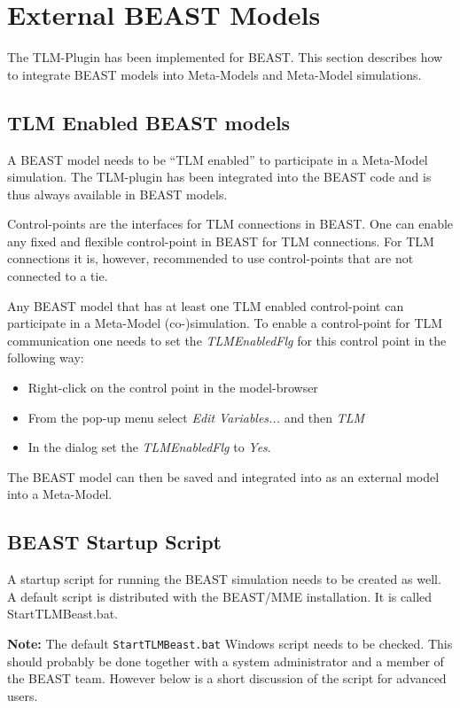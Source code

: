 \chapter{External BEAST Models}
\label{MMBEAST}
The TLM-Plugin has been implemented for BEAST. This section describes
how to integrate BEAST models into Meta-Models and Meta-Model
simulations.

\section{TLM Enabled BEAST models}
A BEAST model needs to be ``TLM enabled'' to participate in a
Meta-Model simulation. The TLM-plugin has been integrated into the
BEAST code and is thus always available in BEAST models.

Control-points are the interfaces for TLM connections in BEAST. One
can enable any fixed and flexible control-point in BEAST for TLM
connections. For TLM connections it is, however, recommended to use
control-points that are not connected to a tie.

Any BEAST model that has at least one TLM enabled control-point can
participate in a Meta-Model (co-)simulation. To enable a control-point
for TLM communication one needs to set the {\em TLMEnabledFlg} for
this control point in the following way:
\begin{itemize}
\item Right-click on the control point in the model-browser
\item From the pop-up menu select {\em Edit Variables...} and then
{\em TLM}
\item In the dialog set the {\em TLMEnabledFlg} to {\em Yes}.
\end{itemize}


The BEAST model can then be saved and integrated into as an external
model into a Meta-Model.


\section{BEAST Startup Script}
A startup script for running the BEAST simulation needs to be created
as well. A default script is distributed with the BEAST/MME
installation. It is called StartTLMBeast.bat.

{\bf Note:} The default \verb!StartTLMBeast.bat! Windows script needs to
be checked. This should probably be done together with a system
administrator and a member of the BEAST team. However below is a short
discussion of the script for advanced users.

